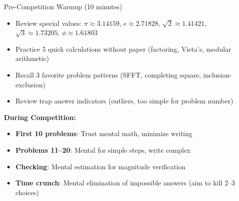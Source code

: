 \documentclass{article}
\begin{document}
\begin{mentalbox}{Pre-Competition Warmup (10 minutes)}
\begin{itemize}
\item Review special values: $\pi\approx3.14159$, $e\approx2.71828$, $\sqrt{2}\approx1.41421$, $\sqrt{3}\approx1.73205$, $\phi\approx1.61803$
\item Practice 5 quick calculations without paper (factoring, Vieta's, modular arithmetic)
\item Recall 3 favorite problem patterns (SFFT, completing square, inclusion-exclusion)
\item Review trap answer indicators (outliers, too simple for problem number)
\end{itemize}

\textbf{During Competition:}
\begin{itemize}
\item \textbf{First 10 problems}: Trust mental math, minimize writing
\item \textbf{Problems 11--20}: Mental for simple steps, write complex
\item \textbf{Checking}: Mental estimation for magnitude verification
\item \textbf{Time crunch}: Mental elimination of impossible answers (aim to kill 2--3 choices)
\end{itemize}
\end{mentalbox}
\end{document}
